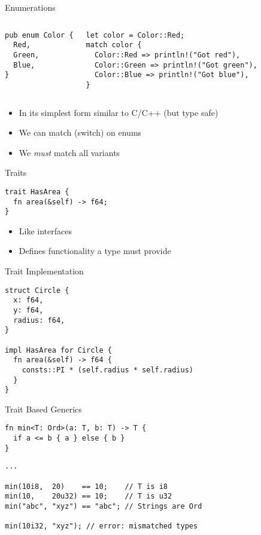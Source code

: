 \begin{frame}[fragile]{Enumerations}
\begin{columns}[t,onlytextwidth]
\begin{verbatim}
pub enum Color {
  Red,
  Green,
  Blue,
}
\end{verbatim}
\begin{verbatim}
let color = Color::Red;
match color {
  Color::Red => println!("Got red"),
  Color::Green => println!("Got green"),
  Color::Blue => println!("Got blue"),
}
\end{verbatim}
\end{columns}
  \begin{itemize}
    \item<1-> In its simplest form similar to C/C++ (but type safe)
    \item<2> We can match (switch) on enums
    \item<2> We \emph{must} match all variants
  \end{itemize}
\end{frame}


\begin{frame}[fragile]{Traits}
\begin{verbatim}
trait HasArea {
  fn area(&self) -> f64;
}
\end{verbatim}
\begin{itemize}
	\item Like interfaces
	\item Defines functionality a type must provide
\end{itemize}
\end{frame}


\begin{frame}[fragile]{Trait Implementation}
\begin{verbatim}
struct Circle {
  x: f64,
  y: f64,
  radius: f64,
}

impl HasArea for Circle {
  fn area(&self) -> f64 {
    consts::PI * (self.radius * self.radius)
  }
}
\end{verbatim}
\end{frame}


\begin{frame}[fragile]{Trait Based Generics}

\begin{verbatim}
fn min<T: Ord>(a: T, b: T) -> T {
  if a <= b { a } else { b }
}
\end{verbatim}
\pause
\begin{verbatim}
...

min(10i8,  20)    == 10;    // T is i8
min(10,    20u32) == 10;    // T is u32
min("abc", "xyz") == "abc"; // Strings are Ord

min(10i32, "xyz"); // error: mismatched types
\end{verbatim}

\end{frame}

